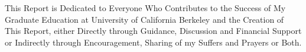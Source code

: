 \ssp

This Report is Dedicated to Everyone Who Contributes to the Success of 
My Graduate Education at University of California Berkeley and the Creation
 of This Report, either Directly through Guidance, Discussion and Financial Support
or Indirectly through Encouragement, Sharing of my Suffers and Prayers or Both.